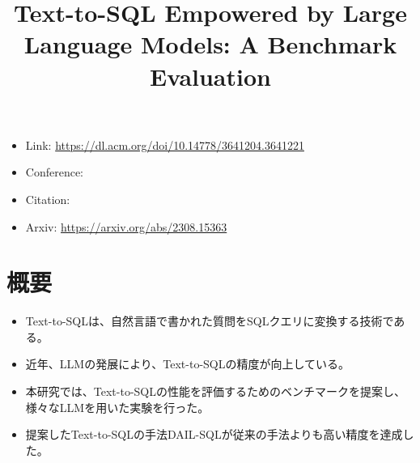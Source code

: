 \documentclass[dvipdfmx,uplatex]{jsarticle}
\title{Text-to-SQL Empowered by Large Language Models: A
Benchmark Evaluation}
\author{\empty}
\date{\empty}
\theoremstyle{remark}
\newenvironment{simplebox}{
    \begin{tcolorbox}[
        fonttitle=\bfseries,
    ]
}{
    \end{tcolorbox}
}
\begin{document}
\maketitle

\begin{itemize}
    \item Link: \url{https://dl.acm.org/doi/10.14778/3641204.3641221}
    \item Conference:
    \item Citation: \cite{text2sql_benchmark}
    \item Arxiv: \url{https://arxiv.org/abs/2308.15363}
\end{itemize}


\section{概要}
\begin{simplebox}
\begin{itemize}
    \item Text-to-SQLは、自然言語で書かれた質問をSQLクエリに変換する技術である。
    \item 近年、LLMの発展により、Text-to-SQLの精度が向上している。
    \item 本研究では、Text-to-SQLの性能を評価するためのベンチマークを提案し、様々なLLMを用いた実験を行った。
    \item 提案したText-to-SQLの手法DAIL-SQLが従来の手法よりも高い精度を達成した。
\end{itemize}
\end{simplebox}



\end{document}

